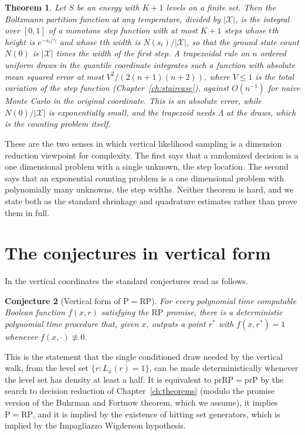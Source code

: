 \documentclass[11pt,twoside,openany]{book}
\theoremstyle{plain}
\newtheorem{theorem}{Theorem}[chapter]
\newtheorem{conjecture}[theorem]{Conjecture}
\theoremstyle{definition}
\theoremstyle{remark}
\newcommand{\cX}{\mathcal{X}}
\newcommand{\RP}{\mathrm{RP}}
\newcommand{\Pc}{\mathrm{P}}
\begin{document}
\begin{theorem}
Let $S$ be an energy with $K + 1$ levels on a finite set. Then the Boltzmann partition function at any temperature, divided by $|\cX|$, is the integral over $[0, 1]$ of a monotone step function with at most $K + 1$ steps whose $t$th height is $e^{-s_t / \gamma}$ and whose $t$th width is $N(s_t) / |\cX|$, so that the ground state count $N(0)$ is $|\cX|$ times the width of the first step. A trapezoidal rule on $n$ ordered uniform draws in the quantile coordinate integrates such a function with absolute mean squared error at most $V^2 / (2(n+1)(n+2))$, where $V \le 1$ is the total variation of the step function (Chapter~\ref{ch:staircase}), against $O(n^{-1})$ for naive Monte Carlo in the original coordinate. This is an absolute error, while $N(0)/|\cX|$ is exponentially small, and the trapezoid needs $\Lambda$ at the draws, which is the counting problem itself.
\end{theorem}

These are the two senses in which vertical likelihood sampling is a dimension reduction viewpoint for complexity. The first says that a randomized decision is a one dimensional problem with a single unknown, the step location. The second says that an exponential counting problem is a one dimensional problem with polynomially many unknowns, the step widths. Neither theorem is hard, and we state both as the standard shrinkage and quadrature estimates rather than prove them in full.

\section{The conjectures in vertical form}

In the vertical coordinates the standard conjectures read as follows.

\begin{conjecture}[Vertical form of $\Pc = \RP$]
For every polynomial time computable Boolean function $f(x, r)$ satisfying the $\RP$ promise, there is a deterministic polynomial time procedure that, given $x$, outputs a point $r^*$ with $f(x, r^*) = 1$ whenever $f(x, \cdot) \not\equiv 0$.
\end{conjecture}

This is the statement that the single conditioned draw needed by the vertical walk, from the level set $\{ r : L_x(r) = 1 \}$, can be made deterministically whenever the level set has density at least a half. It is equivalent to $\mathrm{prRP} = \mathrm{prP}$ by the search to decision reduction of Chapter~\ref{ch:theorems} (modulo the promise version of the Buhrman and Fortnow theorem, which we assume), it implies $\Pc = \RP$, and it is implied by the existence of hitting set generators, which is implied by the Impagliazzo Wigderson hypothesis.
\end{document}
